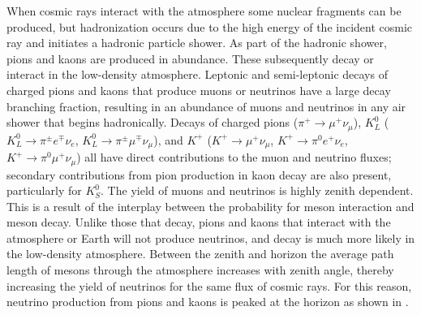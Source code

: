 When cosmic rays interact with the atmosphere some nuclear fragments can be produced, but hadronization occurs due to the high energy of the incident cosmic ray and initiates a hadronic particle shower.
As part of the hadronic shower, pions and kaons are produced in abundance.
These subsequently decay or interact in the low-density atmosphere.
Leptonic and semi-leptonic decays of charged pions and kaons that produce muons or neutrinos have a large decay branching fraction, resulting in an abundance of muons and neutrinos in any air shower that begins hadronically.
Decays of charged pions
($\pi^+\rightarrow\mu^+\nu_\mu$), 
$K_L^0$ ($K_L^0 \rightarrow \pi^\pm e^\mp \nu_e$, $K_L^0 \rightarrow \pi^\pm \mu^\mp \nu_\mu$), and 
$K^+$ ($K^+\rightarrow \mu^+ \nu_\mu$, $K^+\rightarrow \pi^0 e^+ \nu_e$, $K^+\rightarrow \pi^0 \mu^+ \nu_\mu$) 
all have direct contributions to the muon and neutrino fluxes; secondary contributions from pion production in kaon decay are also present, particularly for $K_S^0$.
The yield of muons and neutrinos is highly zenith dependent.
This is a result of the interplay between the probability for meson interaction and meson decay.
Unlike those that decay, pions and kaons that interact with the atmosphere or Earth will not produce neutrinos, and decay is much more likely in the low-density atmosphere.
Between the zenith and horizon the average path length of mesons through the atmosphere increases with zenith angle, thereby increasing the yield of neutrinos for the same flux of cosmic rays.
For this reason, neutrino production from pions and kaons is peaked at the horizon as shown in .

